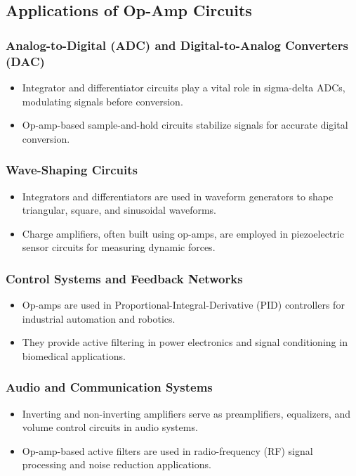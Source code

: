 \documentclass[9pt,conference]{IEEEtran}
\begin{document}
\subsection{Applications of Op-Amp Circuits}

\subsubsection{Analog-to-Digital (ADC) and Digital-to-Analog Converters (DAC)}
\begin{itemize}
    \item Integrator and differentiator circuits play a vital role in sigma-delta ADCs, modulating signals before conversion.
    \item Op-amp-based sample-and-hold circuits stabilize signals for accurate digital conversion.
\end{itemize}

\subsubsection{Wave-Shaping Circuits}
\begin{itemize}
    \item Integrators and differentiators are used in waveform generators to shape triangular, square, and sinusoidal waveforms.
    \item Charge amplifiers, often built using op-amps, are employed in piezoelectric sensor circuits for measuring dynamic forces.
\end{itemize}

\subsubsection{Control Systems and Feedback Networks}
\begin{itemize}
    \item Op-amps are used in Proportional-Integral-Derivative (PID) controllers for industrial automation and robotics.
    \item They provide active filtering in power electronics and signal conditioning in biomedical applications.
\end{itemize}

\subsubsection{Audio and Communication Systems}
\begin{itemize}
    \item Inverting and non-inverting amplifiers serve as preamplifiers, equalizers, and volume control circuits in audio systems.
    \item Op-amp-based active filters are used in radio-frequency (RF) signal processing and noise reduction applications.
\end{itemize}
\end{document}
